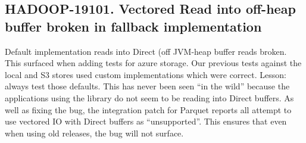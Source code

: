 \documentclass[manuscript]{acmart}
\begin{document}
\subsection{HADOOP-19101. Vectored Read into off-heap buffer broken in fallback implementation}
\label{HADOOP-19101}

Default implementation reads into Direct (off JVM-heap buffer reads broken.
This surfaced when adding tests for azure storage.
Our previous tests against the local and S3 stores used custom implementations
which were correct. Lesson: always test those defaults.
This has never been seen ``in the wild'' because the applications
using the library do not seem to be reading into Direct buffers.
As well as fixing the bug, the integration patch for Parquet reports all
attempt to use vectored IO with Direct buffers as ``unsupported''.
This ensures that even when using old releases, the bug will not surface.
\end{document}
